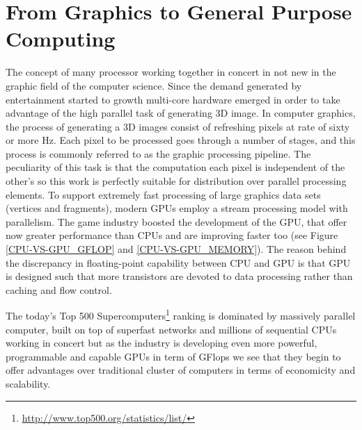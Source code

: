 \section{From Graphics to General Purpose Computing}
The concept of many processor working together in concert in not new in the
graphic field of the computer science. Since the demand generated by
entertainment started to growth multi-core hardware emerged in
order to take advantage of the high parallel task of generating 3D image.
In computer graphics, the process of generating a 3D images consist of
refreshing pixels at rate of sixty or more Hz. Each pixel to be processed
goes through a number of stages, and this process is commonly referred to as
the graphic processing pipeline. The peculiarity of this task is that the
computation each pixel is independent of the other's so this work is perfectly
suitable for distribution over parallel processing elements.
To support extremely fast processing of large graphics data sets (vertices and fragments), modern GPUs employ a
stream processing model with parallelism.
The game industry boosted the development of the GPU, that offer now greater
performance than CPUs and are improving faster too (see Figure
\ref{CPU-VS-GPU_GFLOP} and \ref{CPU-VS-GPU_MEMORY}).
The reason behind the discrepancy in floating-point capability between CPU and
GPU is that GPU is designed such that more transistors are devoted to data
processing rather than caching and flow control.

The today's Top 500 Supercomputers\footnote{\url{http://www.top500.org/statistics/list/}} ranking is
dominated by massively parallel computer, built on top of superfast networks and millions of
sequential CPUs working in concert but as the industry is developing even more
powerful, programmable and capable GPUs in term of GFlops  we see
that they begin to offer advantages over traditional cluster of computers in
terms of economicity and scalability.

